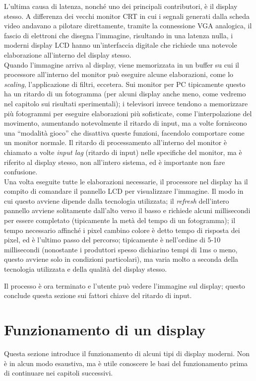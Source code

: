 L'ultima causa di latenza, nonché uno dei principali contributori, è il display stesso. A differenza dei vecchi monitor CRT in cui i segnali generati dalla scheda video andavano a pilotare direttamente, tramite la connessione VGA analogica, il fascio di elettroni che disegna l'immagine, risultando in una latenza nulla, i moderni display LCD hanno un'interfaccia digitale che richiede una notevole elaborazione all'interno del display stesso.\\
Quando l'immagine arriva al display, viene memorizzata in un buffer su cui il processore all'interno del monitor può eseguire alcune elaborazioni, come lo \textit{scaling}, l'applicazione di filtri, eccetera. Sui monitor per PC tipicamente questo ha un ritardo di un fotogramma (per alcuni display anche meno, come vedremo nel capitolo sui risultati sperimentali); i televisori invece tendono a memorizzare più fotogrammi per eseguire elaborazioni più sofisticate, come l'interpolazione del movimento, aumentando notevolmente il ritardo di input, ma a volte forniscono una ``modalità gioco'' che disattiva queste funzioni, facendolo comportare come un monitor normale. Il ritardo di processamento all'interno del monitor è chiamato a volte \textit{input lag} (ritardo di input) nelle specifiche del monitor, ma è riferito al display stesso, non all'intero sistema, ed è importante non fare confusione.\\
Una volta eseguite tutte le elaborazioni necessarie, il processore nel display ha il compito di comandare il pannello LCD per visualizzare l'immagine. Il modo in cui questo avviene dipende dalla tecnologia utilizzata; il \textit{refresh} dell'intero pannello avviene solitamente dall'alto verso il basso e richiede alcuni millisecondi per essere completato (tipicamente la metà del tempo di un fotogramma); il tempo necessario affinché i pixel cambino colore è detto tempo di risposta dei pixel, ed è l'ultimo passo del percorso; tipicamente è nell'ordine di 5-10 millisecondi (nonostante i produttori spesso dichiarino tempi di 1ms o meno, questo avviene solo in condizioni particolari), ma varia molto a seconda della tecnologia utilizzata e della qualità del display stesso.

Il processo è ora terminato e l'utente può vedere l'immagine sul display; questo conclude questa sezione sui fattori chiave del ritardo di input.

\section{Funzionamento di un display}
Questa sezione introduce il funzionamento di alcuni tipi di display moderni. Non è in alcun modo esaustiva, ma è utile conoscere le basi del funzionamento prima di continuare nei capitoli successivi.


